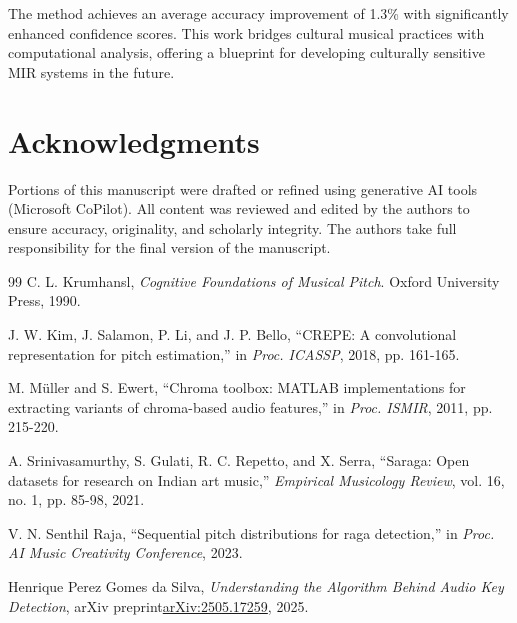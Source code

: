 \documentclass[10pt,twocolumn]{article}
\begin{document}
The method achieves an average accuracy improvement of 1.3\% with significantly enhanced confidence scores.
This work bridges cultural musical practices with computational analysis, offering a blueprint for developing culturally sensitive MIR systems in the future.

\balance

\section*{Acknowledgments}
Portions of this manuscript were drafted or refined using generative AI tools (Microsoft CoPilot).
All content was reviewed and edited by the authors to ensure accuracy, originality, and scholarly integrity.
The authors take full responsibility for the final version of the manuscript.

\begin{thebibliography}{99}
C. L. Krumhansl, \textit{Cognitive Foundations of Musical Pitch}. Oxford University Press, 1990.

J. W. Kim, J. Salamon, P. Li, and J. P. Bello, ``CREPE: A convolutional representation for pitch estimation,'' in \textit{Proc. ICASSP}, 2018, pp. 161-165.

M. M\"uller and S. Ewert, ``Chroma toolbox: MATLAB implementations for extracting variants of chroma-based audio features,'' in \textit{Proc. ISMIR}, 2011, pp. 215-220.

A. Srinivasamurthy, S. Gulati, R. C. Repetto, and X. Serra, ``Saraga: Open datasets for research on Indian art music,'' \textit{Empirical Musicology Review}, vol. 16, no. 1, pp. 85-98, 2021.

V. N. Senthil Raja, ``Sequential pitch distributions for raga detection,'' in \textit{Proc. AI Music Creativity Conference}, 2023.

Henrique Perez Gomes da Silva, \textit{Understanding the Algorithm Behind Audio Key Detection}, arXiv preprint\href{https://arxiv.org/abs/2505.17259}{arXiv:2505.17259}, 2025.

\end{thebibliography}
\end{document}
